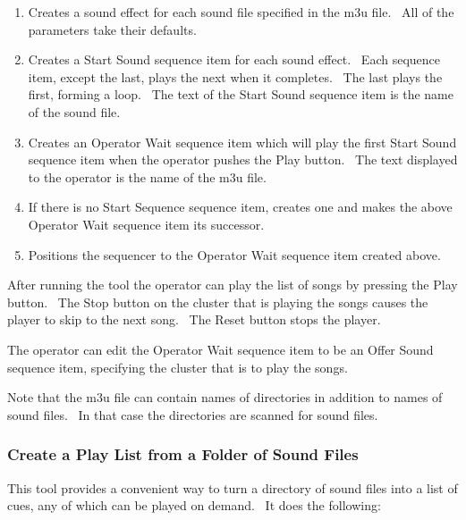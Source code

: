\documentclass[letterpaper]{article}
\newcommand\liststyleLxx{%
\renewcommand\theenumi{\arabic{enumi}}
\renewcommand\theenumii{\arabic{enumii}}
\renewcommand\theenumiii{\arabic{enumiii}}
\renewcommand\theenumiv{\arabic{enumiv}}
\renewcommand\labelenumi{\theenumi.}
\renewcommand\labelenumii{\theenumii.}
\renewcommand\labelenumiii{\theenumiii.}
\renewcommand\labelenumiv{\theenumiv.}
}
\begin{document}
\liststyleLxx
\begin{enumerate}
\item Creates a sound effect for each sound file specified in the m3u
file. \ All of the parameters take their defaults.
\item Creates a Start Sound sequence item for each sound effect. \ Each
sequence item, except the last, plays the next when it completes. \ The
last plays the first, forming a loop. \ The text of the Start Sound
sequence item is the name of the sound file.
\item Creates an Operator Wait sequence item which will play the first
Start Sound sequence item when the operator pushes the Play button.
\ The text displayed to the operator is the name of the m3u file.
\item If there is no Start Sequence sequence item, creates one and makes
the above Operator Wait sequence item its successor.
\item Positions the sequencer to the Operator Wait sequence item created
above.
\end{enumerate}
After running the tool the operator can play the list of songs by
pressing the Play button. \ The Stop button on the cluster that is
playing the songs causes the player to skip to the next song. \ The
Reset button stops the player. 

The operator can edit the Operator Wait sequence item to be an Offer
Sound sequence item, specifying the cluster that is to play the songs.

Note that the m3u file can contain names of directories in addition to
names of sound files. \ In that case the directories are scanned for
sound files.

\subsubsection[Create a Play List from a Folder of Sound Files]{Create a
Play List from a Folder of Sound Files}
This tool provides a convenient way to turn a directory of sound files
into a list of cues, any of which can be played on demand. \ It does
the following:
\end{document}
